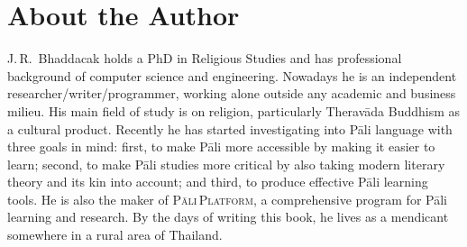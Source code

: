 \cleardoublepage
{}
{}
\chapter*{About the Author}

J.\,R.\ Bhaddacak holds a PhD in Religious Studies and has professional background of computer science and engineering. Nowadays he is an independent researcher/writer/programmer, working alone outside any academic and business milieu. His main field of study is on religion, particularly Therav\=ada Buddhism as a cultural product. Recently he has started investigating into P\=ali language with three goals in mind: first, to make P\=ali more accessible by making it easier to learn; second, to make P\=ali studies more critical by also taking modern literary theory and its kin into account; and third, to produce effective P\=ali learning tools. He is also the maker of \textsc{P\=ali\,Platform}, a comprehensive program for P\=ali learning and research. By the days of writing this book, he lives as a mendicant somewhere in a rural area of Thailand.
